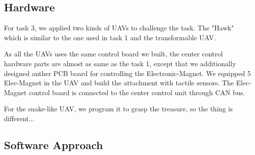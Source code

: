 \documentclass{standalone}
\begin{document}
\subsection{Hardware}
For task 3, we applied two kinds of UAVs to challenge the task. The "Hawk" which is similar to the one used in task 1 and the transformable UAV.

As all the UAVs uses the same control board we built, the center control hardware parts are almost as same as the task 1, except that we additionally designed anther PCB board for controlling the Electronic-Magnet. We equipped 5 Elec-Magnet in the UAV and build the attachment with tactile sensors. The Elec-Magnet control board is connected to the center control unit through CAN bus.

For the snake-like UAV, we program it to grasp the treasure, so the thing is different...

\subsection{Software Approach}
\end{document}
